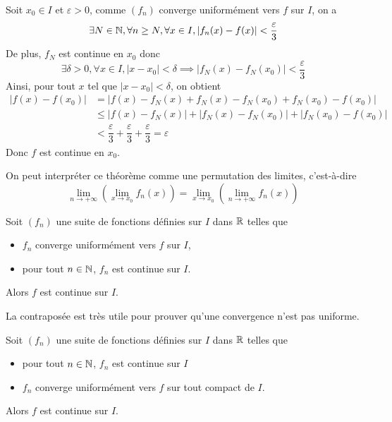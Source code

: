 \documentclass[a4paper, 12pt]{article}
\begin{document}
\begin{demonstration}
    Soit $x_0 \in I$ et $\varepsilon > 0$, comme $(f_n)$ converge uniformément vers $f$ sur $I$, on a
    $$
    \exists N \in \mathbb{N}, \forall n \geq N, \forall x \in I, |f_n(x) - f(x)| < \dfrac{\varepsilon}{3}
    $$
    De plus, $f_N$ est continue en $x_0$ donc
    $$
    \exists \delta > 0, \forall x \in I, |x - x_0| < \delta \implies |f_N(x) - f_N(x_0)| < \dfrac{\varepsilon}{3}
    $$
    Ainsi, pour tout $x$ tel que $|x - x_0| < \delta$, on obtient
    \begin{align*}
        |f(x) - f(x_0)| &= |f(x) - f_N(x) + f_N(x) - f_N(x_0) + f_N(x_0) - f(x_0)| \\
        &\leq |f(x) - f_N(x)| + |f_N(x) - f_N(x_0)| + |f_N(x_0) - f(x_0)| \\
        &< \dfrac{\varepsilon}{3} + \dfrac{\varepsilon}{3} + \dfrac{\varepsilon}{3} = \varepsilon
    \end{align*}
    Donc $f$ est continue en $x_0$.
\end{demonstration}

\begin{remarque}
    On peut interpréter ce théorème comme une permutation des limites, c'est-à-dire
    $$
    \lim\limits_{n \to +\infty} (\lim\limits_{x \to x_0} f_n(x)) = \lim\limits_{x \to x_0} (\lim\limits_{n \to +\infty} f_n(x))
    $$
\end{remarque}

\begin{corollaire}{}{}
    Soit $(f_n)$ une suite de fonctions définies sur $I$ dans $\mathbb{R}$ telles que

    \begin{itemize}[label=--]
        \item $f_n$ converge uniformément vers $f$ sur $I$,
        \item pour tout $n \in \mathbb{N}$, $f_n$ est continue sur $I$.
    \end{itemize}
    Alors $f$ est continue sur $I$.
\end{corollaire}

\begin{remarque}
    La contraposée est très utile pour prouver qu'une convergence n'est pas uniforme.
\end{remarque}

\begin{proposition}{}{}
    Soit $(f_n)$ une suite de fonctions définies sur $I$ dans $\mathbb{R}$ telles que

    \begin{itemize}[label=--]
        \item pour tout $n \in \mathbb{N}$, $f_n$ est continue sur $I$
        \item $f_n$ converge uniformément vers $f$ sur tout compact de $I$.
    \end{itemize}
    Alors $f$ est continue sur $I$.
\end{proposition}
\end{document}
